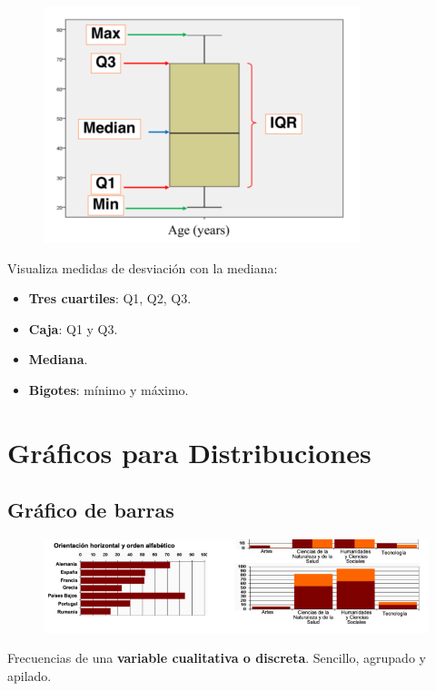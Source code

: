 \documentclass[12pt]{report} %
\begin{document}
\begin{figure}[H]
	{\includegraphics[scale=.5]{Untitled 4.png}}
\end{figure}

Visualiza medidas de desviación con la mediana:

\begin{itemize}

\item
  \textbf{Tres cuartiles}: Q1, Q2, Q3.
\item
  \textbf{Caja}: Q1 y Q3.
\item
  \textbf{Mediana}.
\item
  \textbf{Bigotes}: mínimo y máximo.
\end{itemize}

\section{Gráficos para
Distribuciones}

\subsection{Gráfico de barras}

\begin{figure}[H]
	{\includegraphics[scale=.5]{Untitled 5.png}}
\end{figure}

Frecuencias de una \textbf{variable cualitativa o discreta}. Sencillo,
agrupado y apilado.
\end{document}
